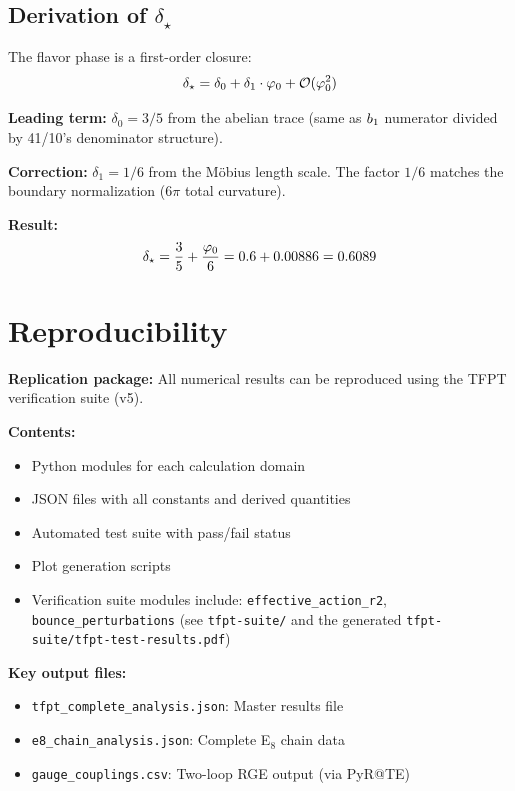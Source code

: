 \subsection{Derivation of $\delta_\star$}

The flavor phase is a first-order closure:
\begin{equation}
    \delta_\star = \delta_0 + \delta_1 \cdot \varphi_0 + \mathcal{O}(\varphi_0^2)
\end{equation}

\textbf{Leading term:} $\delta_0 = 3/5$ from the abelian trace (same as $b_1$ numerator 
divided by 41/10's denominator structure).

\textbf{Correction:} $\delta_1 = 1/6$ from the M\"obius length scale. The factor $1/6$ 
matches the boundary normalization ($6\pi$ total curvature).

\textbf{Result:}
\begin{equation}
    \delta_\star = \frac{3}{5} + \frac{\varphi_0}{6} = 0.6 + 0.00886 = 0.6089
\end{equation}

\section{Reproducibility}
\label{app:repro}

\textbf{Replication package:} All numerical results can be reproduced using the 
TFPT verification suite (v5).

\textbf{Contents:}
\begin{itemize}[leftmargin=1.5em, topsep=2pt, itemsep=1pt]
    \item Python modules for each calculation domain
    \item JSON files with all constants and derived quantities
    \item Automated test suite with pass/fail status
    \item Plot generation scripts
    \item Verification suite modules include: \texttt{effective\_action\_r2}, \texttt{bounce\_perturbations} (see \texttt{tfpt-suite/} and the generated \texttt{tfpt-suite/tfpt-test-results.pdf})
\end{itemize}

\textbf{Key output files:}
\begin{itemize}[leftmargin=1.5em, topsep=2pt, itemsep=1pt]
    \item \texttt{tfpt\_complete\_analysis.json}: Master results file
    \item \texttt{e8\_chain\_analysis.json}: Complete E$_8$ chain data
    \item \texttt{gauge\_couplings.csv}: Two-loop RGE output (via PyR@TE)
\end{itemize}

